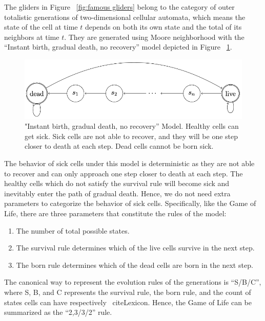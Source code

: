 \documentclass[12pt]{article}
\numberwithin{figure}{section} %
\begin{document}
The gliders in Figure ~\ref{fig:famous gliders} belong to the category of outer totalistic generations of two-dimensional cellular automata, which means the state of the cell at time $t$ depends on both its own state and the total of its neighbors at time $t$. They are generated using Moore neighborhood with the “Instant birth, gradual death, no recovery” model depicted in Figure ~\ref{fig:IGN model}. 

\begin{figure}[H]
\centering
\includegraphics[width=\linewidth]{Section1/9}
\caption{"Instant birth, gradual death, no recovery” Model. Healthy cells can get sick. Sick cells are not able to recover, and they will be one step closer to death at each step. Dead cells cannot be born sick.}
\label{fig:IGN model}
\vspace{-1.5em}
\end{figure}

The behavior of sick cells under this model is deterministic as they are not able to recover and can only approach one step closer to death at each step. The healthy cells which do not satisfy the survival rule will become sick and inevitably enter the path of gradual death. Hence, we do not need extra parameters to categorize the behavior of sick cells. Specifically, like the Game of Life, there are three parameters that constitute the rules of the model: 
\begin{enumerate}[topsep=0pt,itemsep=-1ex,partopsep=1ex,parsep=1ex]
\item The number of total possible states. 
\item The survival rule determines which of the live cells survive in the next step. 
\item The born rule determines which of the dead cells are born in the next step. 
\end{enumerate}
The canonical way to represent the evolution rules of the generations is “S/B/C”, where S, B, and C represents the survival rule, the born rule, and the count of states cells can have respectively ~cite{Lexicon}. Hence, the Game of Life can be summarized as the “2,3/3/2” rule.
\end{document}
